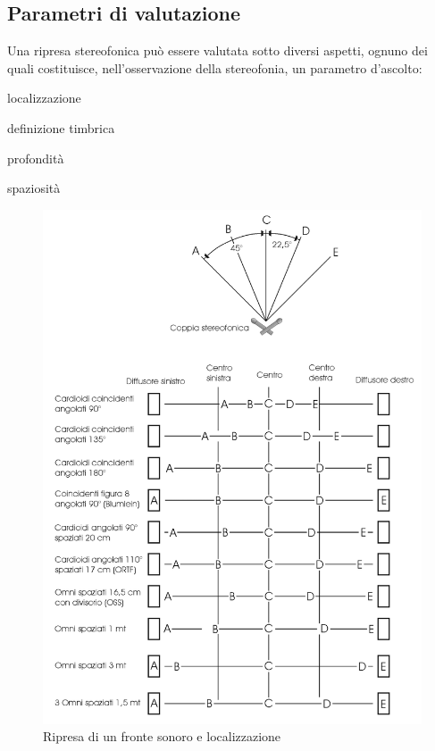 \subsection{Parametri di valutazione}

Una ripresa stereofonica può essere valutata sotto diversi aspetti, ognuno dei
quali costituisce, nell'osservazione della stereofonia, un parametro d’ascolto:

\begin{compactitem}
\item localizzazione
\item definizione timbrica
\item profondità
\item spaziosità
\end{compactitem}

\begin{figure}[th]
\centering
\includegraphics[width=0.99\columnwidth]{CAPITOLI/1000/IMG/localizzazione}
\caption[]{Ripresa di un fronte sonoro e localizzazione}
\label{fig:localizzazione}
\end{figure}


